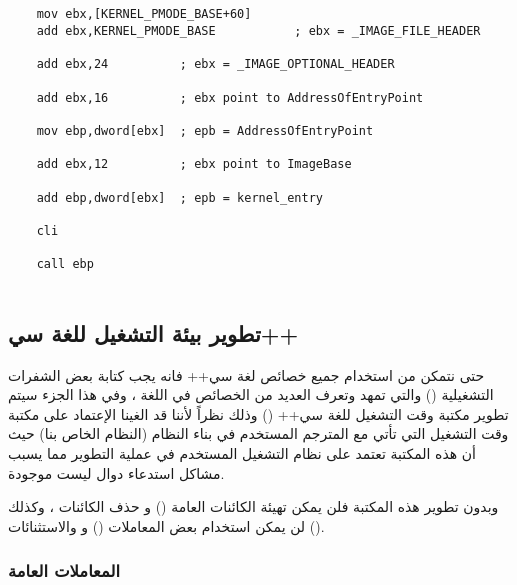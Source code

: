 \documentclass[document.tex]{subfiles}
\begin{document}
\begin{english}

\lstset{numberstyle=\tiny,numbers=left,stepnumber=1,numbers=left,stepnumber=1,numbersep=5pt,tabsize=2,extendedchars=true,breaklines=true,frame=b,showspaces=false, showtabs=false,xleftmargin=10pt,framexleftmargin=10pt,framexrightmargin=5pt,framexbottommargin=4pt,showstringspaces=false,language=[x86masm]Assembler}


\begin{lstlisting}[label=kernel_entry,caption=\en{Getting Kernel entry}]

		
	mov ebx,[KERNEL_PMODE_BASE+60]
	add ebx,KERNEL_PMODE_BASE			; ebx = _IMAGE_FILE_HEADER
		
	add ebx,24			; ebx = _IMAGE_OPTIONAL_HEADER
		
	add ebx,16			; ebx point to AddressOfEntryPoint
		
	mov ebp,dword[ebx]	; epb = AddressOfEntryPoint
		
	add ebx,12			; ebx point to ImageBase
		
	add ebp,dword[ebx]	; epb = kernel_entry
		
	cli
		
	call ebp
		

\end{lstlisting}
\end{english}


\subsection{تطوير بيئة التشغيل للغة سي++}
حتى نتمكن من استخدام جميع خصائص لغة سي++  فانه يجب كتابة بعض الشفرات التشغيلية () والتي تمهد وتعرف العديد من الخصائص في اللغة ، وفي هذا الجزء سيتم تطوير مكتبة وقت التشغيل للغة سي++ ()  وذلك نظراً لأننا قد الغينا الإعتماد على مكتبة وقت التشغيل التي تأتي مع المترجم المستخدم في بناء النظام (النظام الخاص بنا) حيث أن هذه المكتبة  تعتمد على نظام التشغيل المستخدم في عملية التطوير مما يسبب مشاكل استدعاء دوال ليست موجودة.

وبدون تطوير هذه المكتبة فلن يمكن تهيئة الكائنات العامة ()  و حذف الكائنات ، وكذلك لن يمكن استخدام بعض المعاملات () و  والاستثنائات ().


\subsubsection{المعاملات العامة }
\end{document}
